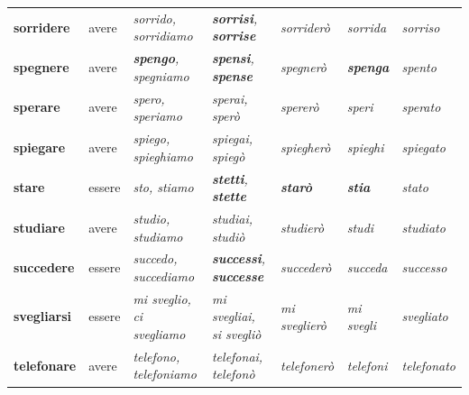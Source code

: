 \documentclass[11pt,a4paper,twoside,openright]{book}
\newcommand{\irr}[1]{{\color{exccol}\bfseries #1}}
\begin{document}
{\begin{xltabular}{\linewidth}{@{}>{\raggedright\arraybackslash}p{2.7cm} l L L l >{\raggedright\arraybackslash}p{1.9cm} l@{}}
\textbf{sorridere} & avere & \textit{sorrido, sorridiamo} & \textit{\irr{sorrisi}, \irr{sorrise}} & \textit{sorriderò} & \textit{sorrida} & \textit{sorriso} \\
\textbf{spegnere} & avere & \textit{\irr{spengo}, spegniamo} & \textit{\irr{spensi}, \irr{spense}} & \textit{spegnerò} & \textit{\irr{spenga}} & \textit{spento} \\
\textbf{sperare} & avere & \textit{spero, speriamo} & \textit{sperai, sperò} & \textit{spererò} & \textit{speri} & \textit{sperato} \\
\textbf{spiegare} & avere & \textit{spiego, spieghiamo} & \textit{spiegai, spiegò} & \textit{spiegherò} & \textit{spieghi} & \textit{spiegato} \\
\textbf{stare} & essere & \textit{sto, stiamo} & \textit{\irr{stetti}, \irr{stette}} & \textit{\irr{starò}} & \textit{\irr{stia}} & \textit{stato} \\
\textbf{studiare} & avere & \textit{studio, studiamo} & \textit{studiai, studiò} & \textit{studierò} & \textit{studi} & \textit{studiato} \\
\textbf{succedere} & essere & \textit{succedo, succediamo} & \textit{\irr{successi}, \irr{successe}} & \textit{succederò} & \textit{succeda} & \textit{successo} \\
\textbf{svegliarsi} & essere & \textit{mi sveglio, ci svegliamo} & \textit{mi svegliai, si svegliò} & \textit{mi sveglierò} & \textit{mi svegli} & \textit{svegliato} \\
\textbf{telefonare} & avere & \textit{telefono, telefoniamo} & \textit{telefonai, telefonò} & \textit{telefonerò} & \textit{telefoni} & \textit{telefonato} \\

\end{xltabular}}
\end{document}
